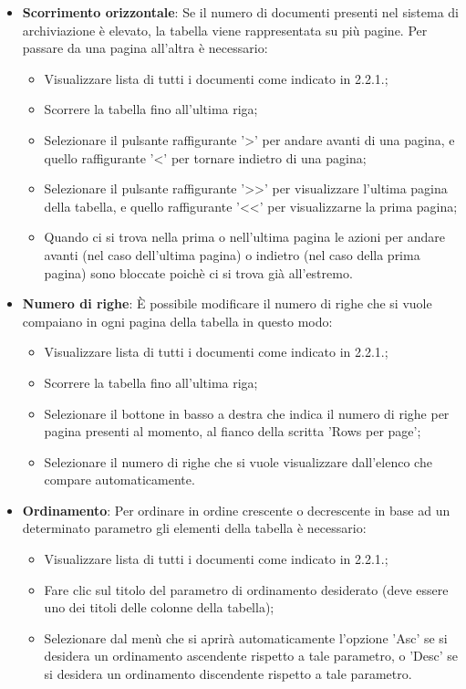 \documentclass[10pt, a4paper]{article}
\begin{document}
\begin{itemize}
\item \textbf{Scorrimento orizzontale}: Se il numero di documenti presenti nel sistema di archiviazione è elevato, la tabella viene rappresentata su più pagine. Per passare da una pagina all'altra è necessario:
\begin{itemize}
    \item Visualizzare lista di tutti i documenti come indicato in 2.2.1.;
    \item Scorrere la tabella fino all'ultima riga;
    \item Selezionare il pulsante raffigurante '>' per andare avanti di una pagina, e quello raffigurante '<' per tornare indietro di una pagina;
    \item Selezionare il pulsante raffigurante '>>' per visualizzare l'ultima pagina della tabella, e quello raffigurante '<<' per visualizzarne la prima pagina;
    \item Quando ci si trova nella prima o nell'ultima pagina le azioni per andare avanti (nel caso dell'ultima pagina) o indietro (nel caso della prima pagina) sono bloccate poichè ci si trova già all'estremo.
\end{itemize}
\item \textbf{Numero di righe}: È possibile modificare il numero di righe che si vuole compaiano in ogni pagina della tabella in questo modo:
\begin{itemize}
    \item Visualizzare lista di tutti i documenti come indicato in 2.2.1.;
    \item Scorrere la tabella fino all'ultima riga;
    \item Selezionare il bottone in basso a destra che indica il numero di righe per pagina presenti al momento, al fianco della scritta 'Rows per page';
    \item Selezionare il numero di righe che si vuole visualizzare dall'elenco che compare automaticamente.
\end{itemize}
\item \textbf{Ordinamento}: Per ordinare in ordine crescente o decrescente in base ad un determinato parametro gli elementi della tabella è necessario:
\begin{itemize}
    \item Visualizzare lista di tutti i documenti come indicato in 2.2.1.;
    \item Fare clic sul titolo del parametro di ordinamento desiderato (deve essere uno dei titoli delle colonne della tabella);
    \item Selezionare dal menù che si aprirà automaticamente l'opzione 'Asc' se si desidera un ordinamento ascendente rispetto a tale parametro, o 'Desc' se si desidera un ordinamento discendente rispetto a tale parametro.

\end{itemize}
\end{itemize}
\end{document}
